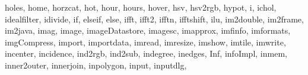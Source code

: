{{        holes,%
        home,%
        horzcat,%
        hot,%
        hour,%
        hours,%
        hover,%
        hsv,%
        hsv2rgb,%
        hypot,%
        i,%
        ichol,%
        idealfilter,%
        idivide,%
        if, elseif, else,%
        ifft,%
        ifft2,%
        ifftn,%
        ifftshift,%
        ilu,%
        im2double,%
        im2frame,%
        im2java,%
        imag,%
        image,%
        imageDatastore,%
        imagesc,%
        imapprox,%
        imfinfo,%
        imformats,%
        imgCompress,%
        import,%
        importdata,%
        imread,%
        imresize,%
        imshow,%
        imtile,%
        imwrite,%
        incenter,%
        incidence,%
        ind2rgb,%
        ind2sub,%
        indegree,%
        inedges,%
        Inf,%
        infoImpl,%
        inmem,%
        inner2outer,%
        innerjoin,%
        inpolygon,%
        input,%
        inputdlg,%
}}
